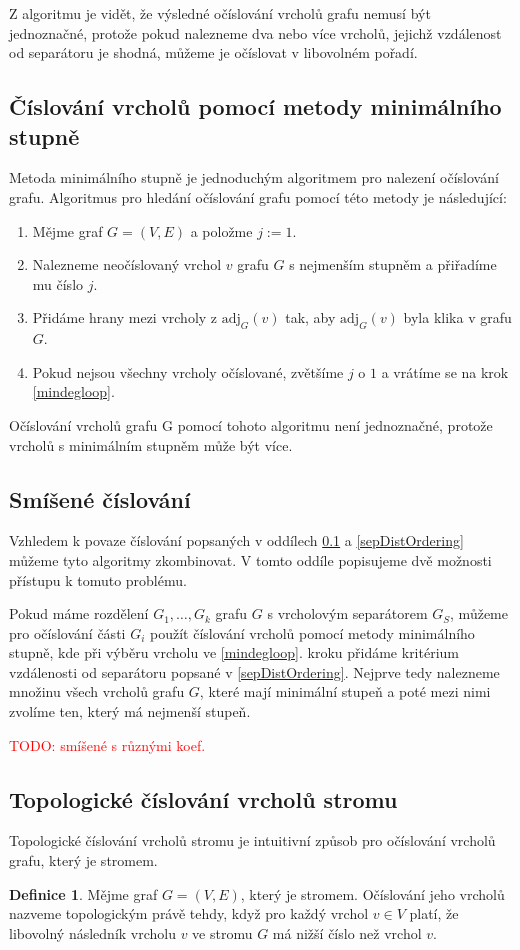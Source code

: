 \documentclass[11pt,american,czech,oneside]{book}
\theoremstyle{plain}
\theoremstyle{definition}
\newtheorem{definition}{Definice}
\newcommand{\TODO}[1]{\textcolor{red}{TODO: #1}}
\begin{document}
Z algoritmu je vidět, že výsledné očíslování vrcholů grafu nemusí být jednoznačné, protože pokud nalezneme dva nebo více vrcholů, jejichž vzdálenost od separátoru je shodná, můžeme je očíslovat v libovolném pořadí.

\subsection{Číslování vrcholů pomocí metody minimálního stupně}
\label{MDordering}
Metoda minimálního stupně je jednoduchým algoritmem pro nalezení očíslování grafu. Algoritmus pro hledání očíslování grafu pomocí této metody je následující:

\begin{enumerate}
  \item Mějme graf $G=(V,E)$ a položme $j:=1$.
  \item \label{mindegloop}
      Nalezneme neočíslovaný vrchol $v$ grafu $G$ s nejmenším stupněm a přiřadíme mu číslo $j$.
  \item Přidáme hrany mezi vrcholy z $\mathrm{adj}_G(v)$ tak, aby $\mathrm{adj}_G(v)$ byla klika v grafu $G$.
  \item Pokud nejsou všechny vrcholy očíslované, zvětšíme $j$ o $1$ a vrátíme se na krok \ref{mindegloop}.
\end{enumerate}

Očíslování vrcholů grafu G pomocí tohoto algoritmu není jednoznačné, protože vrcholů s minimálním stupněm může být více.

\subsection{Smíšené číslování}
Vzhledem k povaze číslování popsaných v oddílech \ref{MDordering} a \ref{sepDistOrdering} můžeme tyto algoritmy zkombinovat. V tomto oddíle popisujeme dvě možnosti přístupu k tomuto problému.

Pokud máme rozdělení $G_1, \ldots, G_k$ grafu $G$ s vrcholovým separátorem $G_S$, můžeme pro očíslování části $G_i$ použít číslování vrcholů pomocí metody minimálního stupně, kde při výběru vrcholu ve \ref{mindegloop}. kroku přidáme kritérium vzdálenosti od separátoru popsané v \ref{sepDistOrdering}. Nejprve tedy nalezneme množinu všech vrcholů grafu $G$, které mají minimální stupeň a poté mezi nimi zvolíme ten, který má nejmenší stupeň.

\TODO{smíšené s různými koef.}

\subsection{Topologické číslování vrcholů stromu}
Topologické číslování vrcholů stromu je intuitivní způsob pro očíslování vrcholů grafu, který je stromem.
\begin{definition}
    Mějme graf $G = (V,E)$, který je stromem. Očíslování jeho vrcholů nazveme topologickým právě tehdy,
    když pro každý vrchol $v \in V$ platí, že libovolný následník vrcholu $v$ ve stromu $G$ má nižší číslo než vrchol $v$.
\end{definition}
\end{document}

